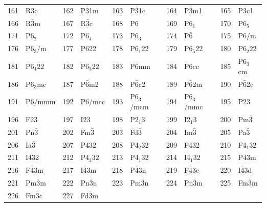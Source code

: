 \documentclass[final,12pt,makeidx,DIV=calc]{article}
\begin{document}
{{{{{{\begin{table}[!h]
\begin{center}
\begin{tabular}{||r|l||r|l||r|l||r|l||r|l||}
161    & R3c                & 
162    & P$\bar{3}$1m       & 
163    & P$\bar{3}$1c       & 
164    & P$\bar{3}$m1       & 
165    & P$\bar{3}$c1       \\
166    & R$\bar{3}$m        & 
167    & R$\bar{3}$c        & 
168    & P6                 & 
169    & P6$_1$             & 
170    & P6$_5$             \\
171    & P6$_2$             & 
172    & P6$_4$             & 
173    & P6$_3$             & 
174    & P$\bar{6}$                & 
175    & P6/m               \\
176    & P6$_3$/m           & 
177    & P622               & 
178    & P6$_1$22           & 
179    & P6$_5$22           & 
180    & P6$_2$22           \\
181    & P6$_4$22           & 
182    & P6$_3$22           & 
183    & P6mm               & 
184    & P6cc               & 
185    & P6$_3$cm           \\
186    & P6$_3$mc           & 
187    & P$\bar{6}$m2       & 
188    & P$\bar{6}$c2       & 
189    & P$\bar{6}$2m       & 
190    & P$\bar{6}$2c       \\
191    & P6/mmm             & 
192    & P6/mcc             & 
193    & P6$_3$/mcm         & 
194    & P6$_3$/mmc         & 
195    & P23                \\
196    & F23                & 
197    & I23                & 
198    & P2$_1$3            & 
199    & I2$_1$3            & 
200    & Pm$\bar{3}$        \\
201    & Pn$\bar{3}$        & 
202    & Fm$\bar{3}$        & 
203    & Fd$\bar{3}$        & 
204    & Im$\bar{3}$        & 
205    & Pa$\bar{3}$        \\
206    & Ia$\bar{3}$        & 
207    & P432               & 
208    & P4$_2$32           & 
209    & F432               & 
210    & F4$_1$32           \\
211    & I432               & 
212    & P4$_3$32           & 
213    & P4$_1$32           & 
214    & I4$_1$32           & 
215    & P$\bar{4}$3m       \\
216    & F$\bar{4}$3m       & 
217    & I$\bar{4}$3m       & 
218    & P$\bar{4}$3n       & 
219    & F$\bar{4}$3c       & 
220    & I$\bar{4}$3d       \\
221    & Pm$\bar{3}$m       & 
222    & Pn$\bar{3}$n       & 
223    & Pm$\bar{3}$n       & 
224    & Pn$\bar{3}$m       & 
225    & Fm$\bar{3}$m       \\
226    & Fm$\bar{3}$c       & 
227    & Fd$\bar{3}$m       & 

\end{tabular}
\end{center}
\end{table}}}}}}}
\end{document}
